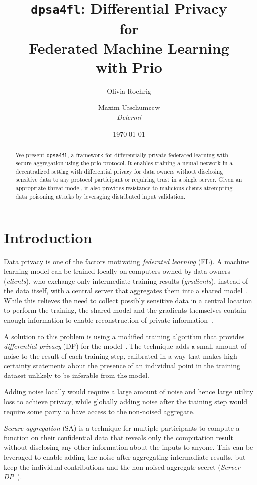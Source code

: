 \documentclass{article}
\title{\texttt{dpsa4fl}: Differential Privacy \\ for \\ Federated Machine
  Learning \\ with Prio}
\author{Olivia Roehrig  \\
	\and
	Maxim Urschumzew \\
	\textit{Determi} \\
	}
\date{\today}
\begin{document}
\maketitle


\begin{abstract}
We present \texttt{dpsa4fl}, a framework for differentially private federated
learning with secure aggregation using the prio protocol. It enables training a
neural network in a decentralized setting with differential privacy for data
owners without disclosing sensitive data to any protocol participant or
requiring trust in a single server. Given an appropriate threat model, it also
provides resistance to malicious clients attempting data poisoning attacks by
leveraging distributed input validation.
\end{abstract}

\section{Introduction}
Data privacy is one of the factors motivating \emph{federated learning} (FL). A
machine learning model can be trained locally on computers owned by data owners
(\emph{clients}), who exchange only intermediate training results
(\emph{gradients}), instead of the data itself, with a central server that
aggregates them into a shared model~\cite{McMahan2016CommunicationEfficientLO}.
While this relieves the need to collect possibly sensitive data in a central
location to perform the training, the shared model and the gradients themselves
contain enough information to enable reconstruction of private
information~\cite{7958568,Boenisch2021WhenTC}.

A solution to this problem is using a modified training algorithm that provides
\emph{differential privacy} (DP) for the model~\cite{Abadi_2016}. The technique adds
a small amount of noise to the result of each training step, calibrated in a way
that makes high certainty statements about the presence of an individual point
in the training dataset unlikely to be inferable from the model.

Adding noise locally would require a large amount of noise and hence large
utility loss to achieve privacy, while globally adding noise after the training
step would require some party to have access to the non-noised aggregate.

\emph{Secure aggregation} (SA) is a technique for multiple
participants to compute a function on their confidential data that reveals only
the computation result without disclosing any other information about the
inputs to anyone. This can be leveraged to enable adding the noise after aggregating
intermediate results, but keep the individual contributions and the non-noised
aggregate secret (\emph{Server-DP}~\cite{dprio}).
\end{document}
